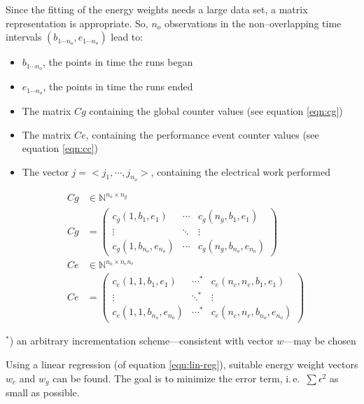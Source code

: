 Since the fitting of the energy weights needs a large data set, a matrix
representation is appropriate. So, $n_o$ observations in the non--overlapping
time intervals $(b_{1 \cdots n_o}, e_{1 \cdots n_o})$ lead to:

\begin{itemize}

\item $b_{1 \cdots n_o}$, the points in time the runs began

\item $e_{1 \cdots n_o}$, the points in time the runs ended

\item The matrix $Cg$ containing the global counter values (see equation
\ref{eqn:cg})

\item The matrix $Ce$, containing the performance event counter values (see
equation \ref{eqn:cc})

\item The vector $j = <j_1, \cdots, j_{n_o}>$, containing the electrical work
performed

\end{itemize}

\begin{eqnarray}
\label{eqn:cg}
& Cg & \in \mathbb{N}^{n_o \times n_g} \\
& Cg & =
\begin{pmatrix}
c_g(1, b_1, e_1)         & \cdots & c_g(n_g, b_1, e_1)        \\
\vdots                   & \ddots & \vdots                    \\
c_g(1, b_{n_o}, e_{n_o}) & \cdots & c_g(n_g, b_{n_o}, e_{n_o})
\end{pmatrix} \\
\label{eqn:cc}
& Ce & \in \mathbb{N}^{n_o \times n_cn_e } \\
& Ce & =
\begin{pmatrix}
c_e(1, 1, b_1, e_1)         & \cdots^* & c_e(n_c, n_e, b_1, e_1)         \\
\vdots                      & \ddots^* & \vdots                          \\
c_e(1, 1, b_{n_o}, e_{n_o}) & \cdots^* & c_e(n_c, n_e, b_{n_o}, e_{n_o})
\end{pmatrix}
\end{eqnarray}

$ ^*$) an arbitrary incrementation scheme---consistent with vector $w$---may be
chosen

Using a linear regression (of equation \ref{eqn:lin-reg}), suitable energy
weight vectors $w_c$ and $w_g$ can be found. The goal is to minimize the error
term, i.\,e.\ $\sum\epsilon^2$ as small as possible.

